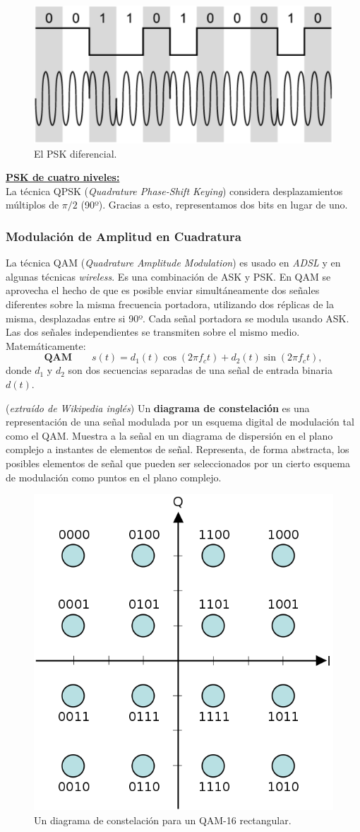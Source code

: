 \documentclass[10pt,a4paper]{article}
\begin{document}
\begin{figure}[ht!]
  \caption{El PSK diferencial.}
  \label{fig:pskd}  
  \centerline{
	\includegraphics[width=0.5\textwidth-\fboxrule-\fboxrule]{imgs/pskd.png}}
\end{figure}

\underline{\textbf{PSK de cuatro niveles:}}\\
La técnica QPSK (\textit{Quadrature Phase-Shift Keying}) considera desplazamientos múltiplos de $\pi/2$ (90º). Gracias a esto, representamos dos bits en lugar de uno.

\subsubsection{Modulación de Amplitud en Cuadratura}
La técnica QAM (\textit{Quadrature Amplitude Modulation}) es usado en \textit{ADSL} y en algunas técnicas \textit{wireless}. Es una combinación de ASK y PSK. En QAM se aprovecha el hecho de que es posible enviar simultáneamente dos señales diferentes sobre la misma frecuencia portadora, utilizando dos réplicas de la misma, desplazadas entre si 90º. Cada señal portadora se modula usando ASK. Las dos señales independientes se transmiten sobre el mismo medio. Matemáticamente:
\[\mathbf{QAM} \qquad
 s(t) = d_1(t) \cos(2\pi f_c t) + d_2(t) \sin(2\pi f_c t),
\]
donde $d_1$ y $d_2$ son dos secuencias separadas de una señal de entrada binaria $d(t)$.

\small{(\textit{extraído de Wikipedia inglés})} Un \textbf{diagrama de constelación} es una representación de una señal modulada por un esquema digital de modulación tal como el QAM. Muestra a la señal en un diagrama de dispersión en el plano complejo a instantes de elementos de señal. Representa, de forma abstracta, los posibles elementos de señal que pueden ser seleccionados por un cierto esquema de modulación como puntos en el plano complejo. 

\begin{figure}[ht!]
  \caption{Un diagrama de constelación para un QAM-16 rectangular.}
  \label{fig:16qam}  
  \centerline{
	\includegraphics[width=0.5\textwidth-\fboxrule-\fboxrule]{imgs/16qam.png}}
\end{figure}
\end{document}
